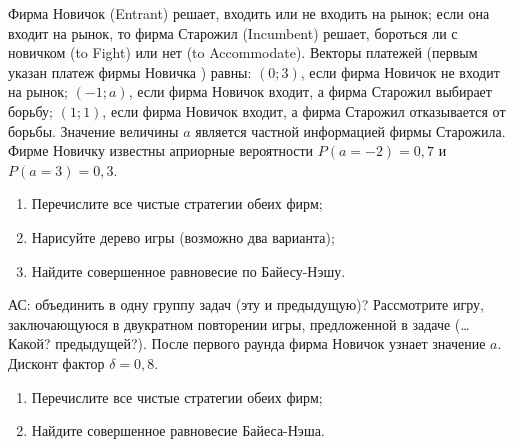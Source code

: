 \begin{problem}
Фирма Новичок (Entrant) решает, входить или не входить на рынок; если она входит на рынок, то фирма Старожил (Incumbent) решает, бороться ли с новичком (to Fight) или нет (to Accommodate). Векторы платежей (первым указан платеж фирмы Новичка ) равны:
$\displaystyle \left(0;3\right)$, если фирма Новичок не входит на рынок;
$\displaystyle \left(-1;a\right)$, если фирма Новичок входит, а фирма Старожил выбирает борьбу;
$\displaystyle \left(1;1\right)$, если фирма Новичок входит, а фирма Старожил отказывается от борьбы.
Значение величины  $a$  является частной информацией фирмы Старожила. Фирме Новичку известны априорные вероятности  $P\left(a=-2\right)=0,7$   и  $P\left(a=3\right)=0,3$.\par
\begin{enumerate}
\item Перечислите все чистые стратегии обеих фирм;\par
\item Нарисуйте дерево игры (возможно два варианта);\par
\item  Найдите совершенное равновесие по Байесу-Нэшу.\par
\end{enumerate}


\begin{sol}

\end{sol}
\end{problem}



\begin{problem}
{\red АС: объединить в одну группу задач (эту и предыдущую)?}
Рассмотрите игру, заключающуюся в двукратном повторении игры, предложенной в задаче (\ldots {\red Какой? предыдущей?}). После первого раунда фирма Новичок узнает значение  $a$.
Дисконт фактор  $\delta =0,8$.\par
\begin{enumerate}
\item Перечислите все чистые стратегии обеих фирм;\par
\item Найдите совершенное равновесие Байеса-Нэша.\par
\end{enumerate}


\begin{sol}

\end{sol}
\end{problem}



